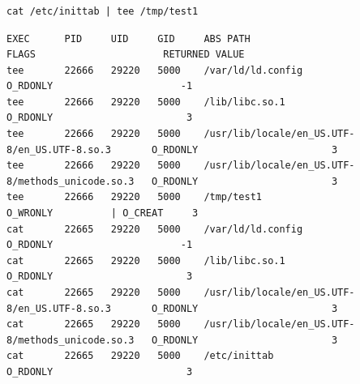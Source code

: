 \documentclass[a4paper]{article}
\begin{document}
\subsubsection{}

\begin{lstlisting}[style=command]
cat /etc/inittab | tee /tmp/test1
\end{lstlisting}
\par 
\begin{lstlisting}[style=esc]
EXEC      PID     UID     GID     ABS PATH                                          FLAGS                      RETURNED VALUE
tee       22666   29220   5000    /var/ld/ld.config                                  O_RDONLY                      -1
tee       22666   29220   5000    /lib/libc.so.1                                     O_RDONLY                       3
tee       22666   29220   5000    /usr/lib/locale/en_US.UTF-8/en_US.UTF-8.so.3       O_RDONLY                       3
tee       22666   29220   5000    /usr/lib/locale/en_US.UTF-8/methods_unicode.so.3   O_RDONLY                       3
tee       22666   29220   5000    /tmp/test1                                         O_WRONLY          | O_CREAT     3
cat       22665   29220   5000    /var/ld/ld.config                                  O_RDONLY                      -1
cat       22665   29220   5000    /lib/libc.so.1                                     O_RDONLY                       3
cat       22665   29220   5000    /usr/lib/locale/en_US.UTF-8/en_US.UTF-8.so.3       O_RDONLY                       3
cat       22665   29220   5000    /usr/lib/locale/en_US.UTF-8/methods_unicode.so.3   O_RDONLY                       3
cat       22665   29220   5000    /etc/inittab                                       O_RDONLY                       3
\end{lstlisting}

\subsubsection{}
\end{document}
